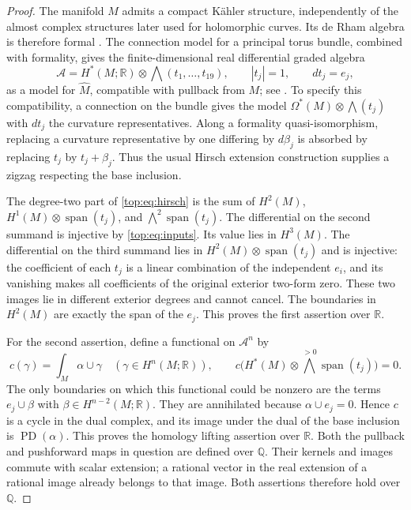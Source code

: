 \documentclass[11pt]{article}
\numberwithin{equation}{section}
\theoremstyle{definition}
\theoremstyle{remark}
\newcommand{\Q}{\mathbb Q}
\newcommand{\R}{\mathbb R}
\newcommand{\PD}{\operatorname{PD}}
\newcommand{\Span}{\operatorname{span}}
\begin{document}
\begin{proof}
The manifold $M$ admits a compact K\"ahler structure, independently of
the almost complex structures later used for holomorphic curves.  Its
de Rham algebra is therefore formal
\cite[Section~6, Main Theorem]{Top:DGMS}.  The connection
model for a principal torus bundle, combined with formality, gives the
finite-dimensional real differential graded algebra
\begin{equation}\label{top:eq:hirsch}
 \mathcal A=H^*(M;\R)\otimes\bigwedge(t_1,\ldots,t_{19}),
 \qquad |t_j|=1,\qquad dt_j=e_j,
\end{equation}
as a model for $\widehat M$, compatible with pullback from $M$;
see \cite[Hirsch Lemma~(3.1) and the principal-fibration discussion]{Top:DGMS}.
To specify this compatibility, a connection on the bundle gives the
model $\Omega^*(M)\otimes\bigwedge(t_j)$ with $dt_j$ the curvature
representatives.  Along a formality quasi-isomorphism, replacing a
curvature representative by one differing by $d\beta_j$ is absorbed by
replacing $t_j$ by $t_j+\beta_j$.  Thus the usual Hirsch extension
construction supplies a zigzag respecting the base inclusion.

The degree-two part of \eqref{top:eq:hirsch} is the sum of
$H^2(M)$, $H^1(M)\otimes\Span(t_j)$, and
$\bigwedge^2\Span(t_j)$.  The differential on the second summand is
injective by \eqref{top:eq:inputs}.  Its value lies in $H^3(M)$.
The differential on the third summand lies in
$H^2(M)\otimes\Span(t_j)$ and is injective: the coefficient of each
$t_j$ is a linear combination of the independent $e_i$, and its
vanishing makes all coefficients of the original exterior two-form
zero.  These two images lie in different exterior degrees and cannot
cancel.  The boundaries in $H^2(M)$ are exactly the span of the $e_j$.
This proves the first assertion over $\R$.

For the second assertion, define a functional on $\mathcal A^n$ by
\[
  c(\gamma)=\int_M\alpha\cup\gamma
       \quad(\gamma\in H^n(M;\R)),
  \qquad
  c\bigl(H^*(M)\otimes\textstyle\bigwedge^{>0}\Span(t_j)\bigr)=0.
\]
The only boundaries on which this functional could be nonzero are the
terms $e_j\cup\beta$ with $\beta\in H^{n-2}(M;\R)$.  They are
annihilated because $\alpha\cup e_j=0$.  Hence $c$ is a cycle in the
dual complex, and its image under the dual of the base inclusion is
$\PD(\alpha)$.  This proves the homology lifting assertion over $\R$.
Both the pullback and pushforward maps in question are defined over
$\Q$.  Their kernels and images commute with scalar extension; a
rational vector in the real extension of a rational image already
belongs to that image.  Both assertions therefore hold over $\Q$.
\end{proof}
\end{document}
